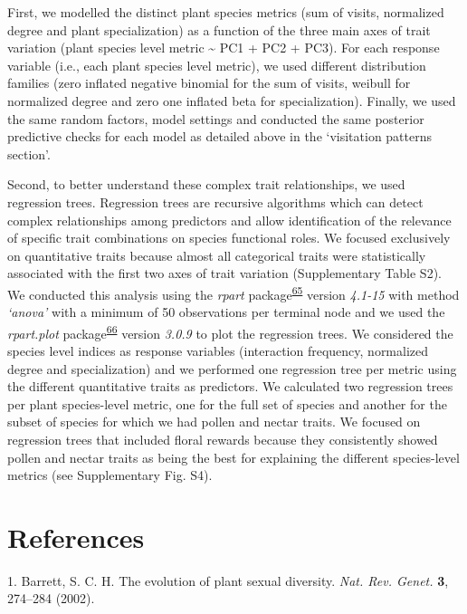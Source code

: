 \documentclass[
  12pt,
  a4paper,
]{article}
\begin{document}
First, we modelled the distinct plant species metrics (sum of visits, normalized degree and plant specialization) as a function of the three main axes of trait variation (plant species level metric \textasciitilde{} PC1 + PC2 + PC3). For each response variable (i.e., each plant species level metric), we used different distribution families (zero inflated negative binomial for the sum of visits, weibull for normalized degree and zero one inflated beta for specialization). Finally, we used the same random factors, model settings and conducted the same posterior predictive checks for each model as detailed above in the `visitation patterns section'.

Second, to better understand these complex trait relationships, we used regression trees. Regression trees are recursive algorithms which can detect complex relationships among predictors and allow identification of the relevance of specific trait combinations on species functional roles. We focused exclusively on quantitative traits because almost all categorical traits were statistically associated with the first two axes of trait variation (Supplementary Table S2). We conducted this analysis using the \emph{rpart} package\textsuperscript{\protect\hyperlink{ref-therneau2015}{65}} version \emph{4.1-15} with method \emph{`anova'} with a minimum of 50 observations per terminal node and we used the \emph{rpart.plot} package\textsuperscript{\protect\hyperlink{ref-milborrow2015}{66}} version \emph{3.0.9} to plot the regression trees. We considered the species level indices as response variables (interaction frequency, normalized degree and specialization) and we performed one regression tree per metric using the different quantitative traits as predictors. We calculated two regression trees per plant species-level metric, one for the full set of species and another for the subset of species for which we had pollen and nectar traits. We focused on regression trees that included floral rewards because they consistently showed pollen and nectar traits as being the best for explaining the different species-level metrics (see Supplementary Fig. S4).

\hypertarget{references}{%
\section{References}\label{references}}

\hypertarget{refs}{}
\leavevmode\hypertarget{ref-barrett2002}{}%
1. Barrett, S. C. H. The evolution of plant sexual diversity. \emph{Nat. Rev. Genet.} \textbf{3}, 274--284 (2002).
\end{document}
